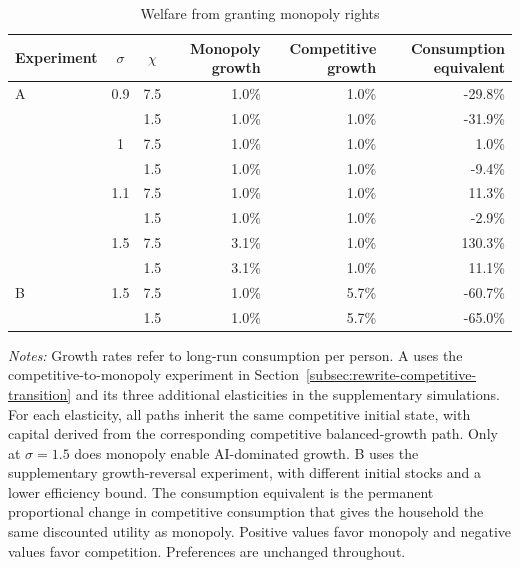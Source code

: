 \begin{table}[htbp]
\centering
\caption{Welfare from granting monopoly rights}
\label{tab:rewrite-welfare}
\small{}
\setlength{\tabcolsep}{4pt}
\begin{tabular}{lccrrr}
\toprule
Experiment & $\sigma$ & $\chi$ & Monopoly growth & Competitive growth & Consumption equivalent\\
\midrule
A & 0.9 & 7.5 & 1.0\% & 1.0\% & -29.8\%\\
 &  & 1.5 & 1.0\% & 1.0\% & -31.9\%\\
 & 1 & 7.5 & 1.0\% & 1.0\% & 1.0\%\\
 &  & 1.5 & 1.0\% & 1.0\% & -9.4\%\\
 & 1.1 & 7.5 & 1.0\% & 1.0\% & 11.3\%\\
 &  & 1.5 & 1.0\% & 1.0\% & -2.9\%\\
 & 1.5 & 7.5 & 3.1\% & 1.0\% & 130.3\%\\
 &  & 1.5 & 3.1\% & 1.0\% & 11.1\%\\
\midrule
B & 1.5 & 7.5 & 1.0\% & 5.7\% & -60.7\%\\
 &  & 1.5 & 1.0\% & 5.7\% & -65.0\%\\
\bottomrule
\end{tabular}
\par\vspace{4pt}
\parbox{0.95\textwidth}{\footnotesize\emph{Notes:} Growth rates refer to long-run consumption per person. A uses the competitive-to-monopoly experiment in Section~\ref{subsec:rewrite-competitive-transition} and its three additional elasticities in the supplementary simulations. For each elasticity, all paths inherit the same competitive initial state, with capital derived from the corresponding competitive balanced-growth path. Only at $\sigma=1.5$ does monopoly enable AI-dominated growth. B uses the supplementary growth-reversal experiment, with different initial stocks and a lower efficiency bound. The consumption equivalent is the permanent proportional change in competitive consumption that gives the household the same discounted utility as monopoly. Positive values favor monopoly and negative values favor competition. Preferences are unchanged throughout.}
\end{table}
